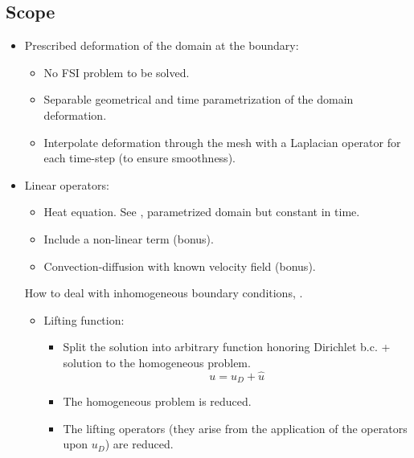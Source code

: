 \documentclass[../main.tex]{subfiles}
\begin{document}
\subsection{Scope}
\begin{itemize}
    \item Prescribed deformation of the domain at the boundary:
    \begin{itemize}
        \item No FSI problem to be solved.
        \item Separable geometrical and time parametrization of the domain deformation.
        \item Interpolate deformation through the mesh with a Laplacian operator for each time-step (to ensure smoothness).
    \end{itemize}
    \item Linear operators:
    \begin{itemize}
        \item Heat equation. See \cite{2009_reducedBasisMethodsAPosterioriErrorEstimatorsHeatTransferProblems_Rozza}, parametrized domain but constant in time.
        \item Include a non-linear term (bonus). 
        \item Convection-diffusion with known velocity field (bonus). 
    \end{itemize}

    How to deal with inhomogeneous boundary conditions, \cite{2007_ReducedOrderModelingTimeDependentPDEsMultipleParametersBoundaryData_gunzburger}.
    \begin{itemize}
        \item Lifting function:
        \begin{itemize}
            \item Split the solution into arbitrary function honoring Dirichlet b.c. + solution to the homogeneous problem.
            \begin{equation*}
                u = u_D + \hat{u}
            \end{equation*}
            \item The homogeneous problem is reduced.
            \item The lifting operators (they arise from the application of the operators upon $u_D$) are reduced. 
        \end{itemize}
    \end{itemize}

\end{itemize}
\end{document}
